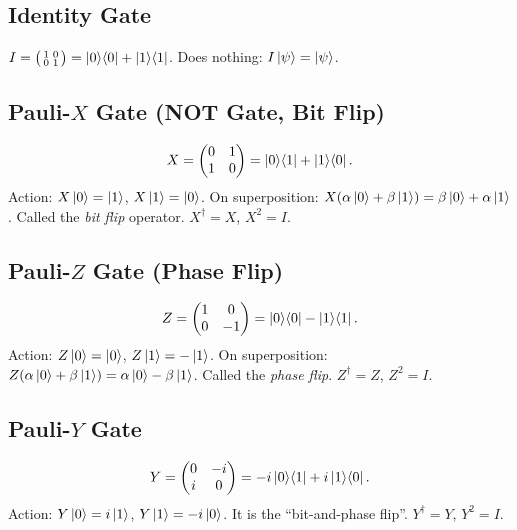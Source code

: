 \documentclass[10pt,a4paper]{article}
\begin{document}
\subsection{Identity Gate}
$I=\bigl(\begin{smallmatrix}1&0\\0&1\end{smallmatrix}\bigr)=\ket{0}\!\bra{0}+\ket{1}\!\bra{1}$. Does nothing: $I\ket{\psi}=\ket{\psi}$.

\subsection{Pauli-$X$ Gate (NOT Gate, Bit Flip)}

\begin{tcolorbox}[defstyle, title={Definition: Pauli-$X$ Gate}]
\[
X = \begin{pmatrix}0&1\\1&0\end{pmatrix} = \ket{0}\!\bra{1}+\ket{1}\!\bra{0}.
\]
Action: $X\ket{0}=\ket{1}$, $X\ket{1}=\ket{0}$. On superposition: $X(\alpha\ket{0}+\beta\ket{1})=\beta\ket{0}+\alpha\ket{1}$. Called the \emph{bit flip} operator. $X^\dagger=X$, $X^2=I$.
\end{tcolorbox}

\subsection{Pauli-$Z$ Gate (Phase Flip)}

\begin{tcolorbox}[defstyle, title={Definition: Pauli-$Z$ Gate}]
\[
Z = \begin{pmatrix}1&0\\0&-1\end{pmatrix} = \ket{0}\!\bra{0}-\ket{1}\!\bra{1}.
\]
Action: $Z\ket{0}=\ket{0}$, $Z\ket{1}=-\ket{1}$. On superposition: $Z(\alpha\ket{0}+\beta\ket{1})=\alpha\ket{0}-\beta\ket{1}$. Called the \emph{phase flip}. $Z^\dagger=Z$, $Z^2=I$.
\end{tcolorbox}

\subsection{Pauli-$Y$ Gate}

\begin{tcolorbox}[defstyle, title={Definition: Pauli-$Y$ Gate}]
\[
Y = \begin{pmatrix}0&-i\\i&0\end{pmatrix} = -i\ket{0}\!\bra{1}+i\ket{1}\!\bra{0}.
\]
Action: $Y\ket{0}=i\ket{1}$, $Y\ket{1}=-i\ket{0}$. It is the ``bit-and-phase flip''. $Y^\dagger=Y$, $Y^2=I$.
\end{tcolorbox}
\end{document}
